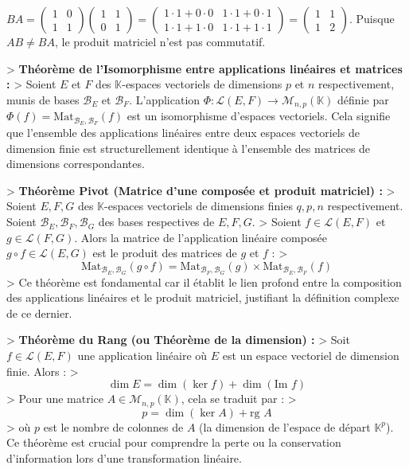 \documentclass[12pt,a4paper]{report}
\begin{document}
    $BA = \begin{pmatrix} 1 & 0 \\ 1 & 1 \end{pmatrix} \begin{pmatrix} 1 & 1 \\ 0 & 1 \end{pmatrix} = \begin{pmatrix} 1 \cdot 1 + 0 \cdot 0 & 1 \cdot 1 + 0 \cdot 1 \\ 1 \cdot 1 + 1 \cdot 0 & 1 \cdot 1 + 1 \cdot 1 \end{pmatrix} = \begin{pmatrix} 1 & 1 \\ 1 & 2 \end{pmatrix}$.
    Puisque $AB \neq BA$, le produit matriciel n'est pas commutatif.

> \textbf{Théorème de l'Isomorphisme entre applications linéaires et matrices :}
> Soient $E$ et $F$ des $\mathbb{K}$-espaces vectoriels de dimensions $p$ et $n$ respectivement, munis de bases $\mathcal{B}_E$ et $\mathcal{B}_F$. L'application $\Phi : \mathcal{L}(E, F) \to \mathcal{M}_{n,p}(\mathbb{K})$ définie par $\Phi(f) = \text{Mat}_{\mathcal{B}_E, \mathcal{B}_F}(f)$ est un isomorphisme d'espaces vectoriels. Cela signifie que l'ensemble des applications linéaires entre deux espaces vectoriels de dimension finie est structurellement identique à l'ensemble des matrices de dimensions correspondantes.

> \textbf{Théorème Pivot (Matrice d'une composée et produit matriciel) :}
> Soient $E, F, G$ des $\mathbb{K}$-espaces vectoriels de dimensions finies $q, p, n$ respectivement. Soient $\mathcal{B}_E, \mathcal{B}_F, \mathcal{B}_G$ des bases respectives de $E, F, G$.
> Soient $f \in \mathcal{L}(E, F)$ et $g \in \mathcal{L}(F, G)$. Alors la matrice de l'application linéaire composée $g \circ f \in \mathcal{L}(E, G)$ est le produit des matrices de $g$ et $f$ :
> $$\text{Mat}_{\mathcal{B}_E, \mathcal{B}_G}(g \circ f) = \text{Mat}_{\mathcal{B}_F, \mathcal{B}_G}(g) \times \text{Mat}_{\mathcal{B}_E, \mathcal{B}_F}(f)$$
> Ce théorème est fondamental car il établit le lien profond entre la composition des applications linéaires et le produit matriciel, justifiant la définition complexe de ce dernier.

> \textbf{Théorème du Rang (ou Théorème de la dimension) :}
> Soit $f \in \mathcal{L}(E, F)$ une application linéaire où $E$ est un espace vectoriel de dimension finie. Alors :
> $$\dim E = \dim(\ker f) + \dim(\text{Im } f)$$
> Pour une matrice $A \in \mathcal{M}_{n,p}(\mathbb{K})$, cela se traduit par :
> $$p = \dim(\ker A) + \text{rg } A$$
> où $p$ est le nombre de colonnes de $A$ (la dimension de l'espace de départ $\mathbb{K}^p$). Ce théorème est crucial pour comprendre la perte ou la conservation d'information lors d'une transformation linéaire.
\end{document}
